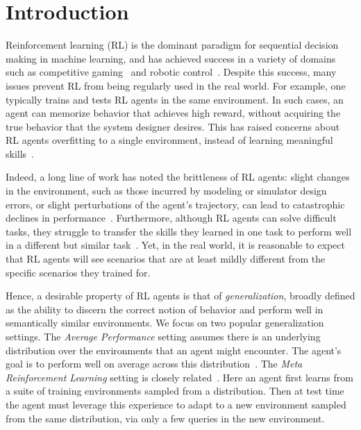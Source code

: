 \documentclass[11pt,twoside]{article}
\begin{document}



\section{Introduction}
\label{sec:intro}
Reinforcement learning (RL) is the dominant paradigm for sequential decision making in machine learning, and has achieved success in a variety of domains such as competitive gaming~\citep{mnih15, silver17} and robotic control~\citep{gu17, haarnoja18}. Despite this success, many issues prevent RL from being regularly used in the real world. For example, one typically trains and tests RL agents in the same environment. In such cases, an agent can memorize behavior that achieves high reward, without acquiring the true behavior that the system designer desires. This has raised concerns about RL agents overfitting to a single environment, instead of learning meaningful skills~\citep{farebrother18}.

Indeed, a long line of work has noted the brittleness of RL agents: slight changes in the environment, such as those incurred by modeling or simulator design errors, or slight perturbations of the agent's trajectory, can lead to catastrophic declines in performance~\citep{rajeswaran17, zhang18, henderson18}. Furthermore, although RL agents can solve difficult tasks, they struggle to transfer the skills they learned in one task to perform well in a different but similar task~\citep{rakelly19, yu19}. Yet, in the real world, it is reasonable to expect that RL agents will see scenarios that are at least mildly different from the specific scenarios they trained for.

Hence, a desirable property of RL agents is that of \emph{generalization}, broadly defined as the ability to discern the correct notion of behavior and perform well in semantically similar environments. We focus on two popular generalization settings. The \emph{Average Performance} setting assumes there is an underlying distribution over the environments that an agent might encounter. The agent's goal is to perform well on average across this distribution~\citep{packer18, nichol18, cobbe19}. The \emph{Meta Reinforcement Learning} setting is closely related~\citep{finn17, clavera18, rakelly19}. Here an agent first learns from a suite of training environments sampled from a distribution. Then at test time the agent must leverage this experience to adapt to a new environment sampled from the same distribution, via only a few queries in the new environment.
\end{document}
